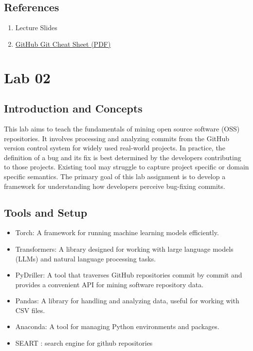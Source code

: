 \documentclass[a4paper,12pt,twoside,english]{all-in-one} %
\begin{document}
\subsection{References}
\begin{enumerate}
    \item Lecture Slides
    \item \href{https://education.github.com/git-cheat-sheet-education.pdf}{GitHub Git Cheat Sheet (PDF)}
\end{enumerate}



\newpage
\section{Lab 02}
\subsection{Introduction and Concepts}
This lab aims to teach the fundamentals of mining open source software (OSS) repositories. It involves processing and analyzing commits from the GitHub version control system for widely used real-world projects. In practice, the definition of a bug and its fix is best determined by the developers contributing to those projects. Existing tool may struggle to capture project specific or domain specific semantics. The primary goal of this lab assignment is to develop a framework for understanding how developers perceive bug-fixing commits.
\subsection{Tools and Setup}
\begin{itemize}
    \item Torch: A framework for running machine learning models efficiently.
    \item Transformers: A library designed for working with large language models (LLMs) and natural language processing tasks.
    \item PyDriller: A tool that traverses GitHub repositories commit by commit and provides a convenient API for mining software repository data.
    \item Pandas: A library for handling and analyzing data, useful for working with CSV files.
    \item Anaconda: A tool for managing Python environments and packages.
    \item SEART :  search engine for github repositories
\end{itemize}
\end{document}
